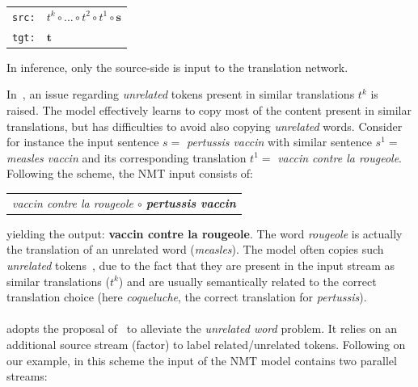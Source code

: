 \begin{center}
\begin{tabular}{ll}
\texttt{src:} & $t^{k} \circ ... \circ t^{2} \circ t^{1} \circ \textbf{s}$ \\
\texttt{tgt:} & $\textbf{t}$%
\end{tabular}
\end{center}
\noindent In inference, only the source-side is input to the translation network.

In~\citet{xu20boosting}, an issue regarding {\em unrelated} tokens present in similar translations $t^k$ is raised. The model effectively learns to copy most of the content present in similar translations, but has difficulties to avoid also copying {\em unrelated} words. Consider for instance the input sentence $s=$ {\it pertussis vaccin} with similar sentence $s^1=$ {\it measles vaccin} and its corresponding translation $t^1=$ {\it vaccin contre la rougeole}. Following the  scheme, the NMT input consists of:
\begin{center}
\begin{tabular}{c}
\it vaccin contre la rougeole $\circ$ {\bf pertussis vaccin} \\
\end{tabular}
\end{center}
\noindent yielding the output: {\bf vaccin contre la rougeole}.
%
The word {\it rougeole} is actually the translation of an unrelated word ({\it measles}). The model often copies such {\em unrelated} tokens~\cite{xu20boosting}, due to the fact that they are present in the input stream as similar translations ($t^k$) and are usually semantically related to the correct translation choice (here {\it coqueluche}, the correct translation for {\it pertussis}).

\paragraph{} adopts the proposal of~\citet{xu20boosting} to alleviate the {\em unrelated word} problem. It relies on an additional source stream (factor) to label related/unrelated tokens. Following on our example, in this scheme the input of the NMT model contains two parallel streams:

\begin{center}
\end{center}

